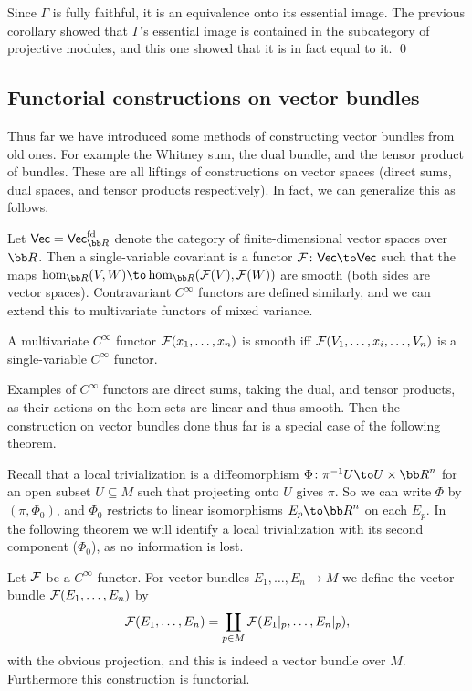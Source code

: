     Since $\Gamma$ is fully faithful, it is an equivalence onto its essential image.
    The previous corollary showed that $\Gamma$'s essential image is contained in the subcategory of projective modules, and this one showed that it is in fact
    equal to it.
    \qed

\eproof

\subsection{Functorial constructions on vector bundles}

Thus far we have introduced some methods of constructing vector bundles from old ones.
For example the Whitney sum, the dual bundle, and the tensor product of bundles.
These are all liftings of constructions on vector spaces (direct sums, dual spaces, and tensor products respectively).
In fact, we can generalize this as follows.

\bdefn

    Let $\Vec=\Vec_\bR^{\rm fd}$ denote the category of finite-dimensional vector spaces over $\bR$.
    Then a single-variable covariant  is a functor $\F\colon\Vec\to\Vec$ such that the maps $\hom_\bR(V,W)\to\hom_\bR(\F(V),\F(W))$ are smooth
    (both sides are vector spaces).
    Contravariant $C^\infty$ functors are defined similarly, and we can extend this to multivariate functors of mixed variance.

\edefn

A multivariate $C^\infty$ functor ${{\cal F}}(x_1,\dots,x_n)$ is smooth iff ${{\cal F}}(V_1,\dots,x_i,\dots,V_n)$ is a single-variable $C^\infty$ functor.

Examples of $C^\infty$ functors are direct sums, taking the dual, and tensor products, as their actions on the hom-sets are linear and thus smooth.
Then the construction on vector bundles done thus far is a special case of the following theorem.

Recall that a local trivialization is a diffeomorphism $\Phi\colon\pi^{-1}U\to U\times\bR^n$ for an open subset $U\subseteq M$
such that projecting onto $U$ gives $\pi$.
So we can write $\Phi$ by $(\pi,\Phi_0)$, and $\Phi_0$ restricts to linear isomorphisms $E_p\to\bR^n$ on each $E_p$.
In the following theorem we will identify a local trivialization with its second component ($\Phi_0$), as no information is lost.

\bthrm

    Let ${{\cal F}}$ be a $C^\infty$ functor.
    For vector bundles $E_1,\dots,E_n\to M$ we define the vector bundle ${{\cal F}}(E_1,\dots,E_n)$ by
    $$ {{\cal F}}(E_1,\dots,E_n) = \coprod_{p\in M}{{\cal F}}(E_1|_p,\dots,E_n|_p) , $$
    with the obvious projection, and this is indeed a vector bundle over $M$.
    Furthermore this construction is functorial.

